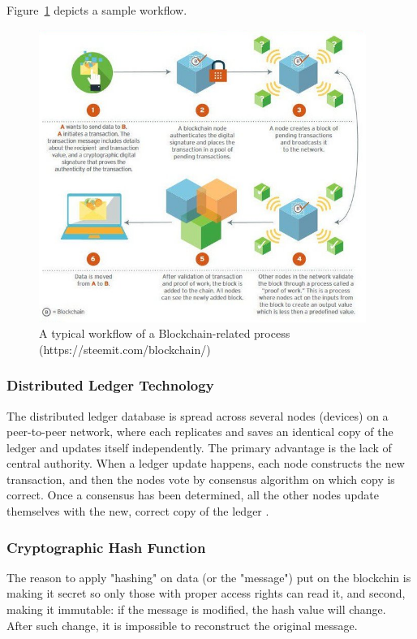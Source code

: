 \documentclass[a4paper]{article}
\begin{document}
Figure~\ref{fig:BC_Workflow} depicts a sample workflow.
\begin{figure}[H]
    \centering
    \includegraphics[width=0.95\textwidth]{figures/sample_BC_flow.png}
    \caption{A typical workflow of a Blockchain-related process (https://steemit.com/blockchain/)}
    \label{fig:BC_Workflow}
\end{figure}

\subsubsection{Distributed Ledger Technology}
The distributed ledger database is spread across several nodes (devices) on a peer-to-peer network, where each replicates and saves an identical copy of the ledger and updates itself independently. The primary advantage is the lack of central authority. When a ledger update happens, each node constructs the new transaction, and then the nodes vote by consensus algorithm on which copy is correct. Once a consensus has been determined, all the other nodes update themselves with the new, correct copy of the ledger \cite{DLT}.


\subsubsection{Cryptographic Hash Function}
The reason to apply "hashing" on data (or the "message") put on the blockchin is making it secret so only those with proper access rights can read it, and second, making it immutable: if the message is modified, the hash value will change. After such change, it is impossible to reconstruct the original message.
\end{document}
